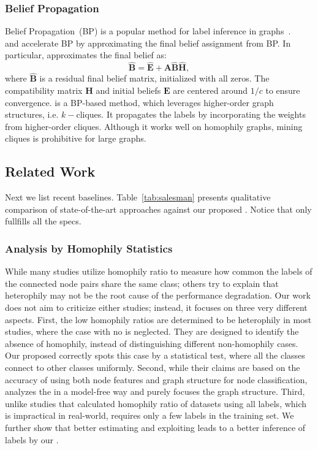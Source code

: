 \subsubsection*{Belief Propagation} 
Belief Propagation~(BP) is a popular method for label inference in graphs~\cite{pearl2014probabilistic, DBLP:journals/pvldb/GatterbauerGKF15, DBLP:conf/pkdd/KoutraKKCPF11}.
\fabp~\cite{DBLP:conf/pkdd/KoutraKKCPF11} and \linbp \cite{DBLP:journals/pvldb/GatterbauerGKF15} accelerate BP by approximating the final belief assignment from BP. In particular, \linbp approximates the final belief as:
\begin{equation} \label{eq:prop}
	\hat{{\boldsymbol B}} = \hat{{\boldsymbol E}} + {\boldsymbol A}\hat{{\boldsymbol B}}\hat{{\boldsymbol H}},
\end{equation}
where $\hat{{\boldsymbol B}}$ is a residual final belief matrix, initialized with all zeros.
The compatibility matrix ${\boldsymbol H}$ and initial beliefs ${\boldsymbol E}$ are centered around $1 / c$ to ensure convergence.
\hols \cite{eswaran2020higher} is a BP-based method, which leverages higher-order graph structures, i.e. $k-$cliques.
It propagates the labels by incorporating the weights from higher-order cliques. 
Although it works well on homophily graphs, mining cliques is prohibitive for large graphs.

\subsection{Related Work}
Next we list recent baselines.
Table~\ref{tab:salesman} presents qualitative comparison of state-of-the-art approaches against our proposed \method.
Notice that only \method fullfills all the specs.

\subsubsection*{Analysis by Homophily Statistics}
While many studies \cite{zhu2020beyond, luan2021heterophily, lim2021large, ma2022is} utilize homophily ratio to measure how common the labels of the connected node pairs share the same class;
others \cite{ma2021homophily, du2022gbk} try to explain that heterophily may not be the root cause of the performance degradation.
Our work does not aim to criticize either studies; instead, it focuses on three very different aspects.
First, the low homophily ratios are determined to be heterophily in most studies, where the case with no \nef is neglected.
They are designed to identify the absence of homophily, instead of distinguishing different non-homophily cases.
Our proposed \methodtest correctly spots this case by a statistical test, where all the classes connect to other classes uniformly.
Second, while their claims are based on the accuracy of using both node features and graph structure for node classification, \methodtest analyzes the \nef in a model-free way and purely focuses the graph structure.
Third, unlike studies that calculated homophily ratio of datasets using all labels, which is impractical in real-world, \methodtest requires only a few labels in the training set.
We further show that better estimating and exploiting \nef leads to a better inference of labels by our \method.

